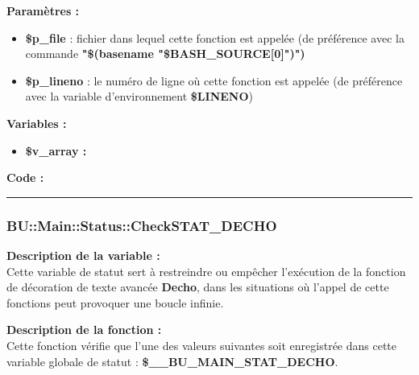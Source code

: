 \documentclass[a4paper,10pt]{article}
\begin{document}
\begin{justify}
    \textbf{Paramètres :}

    \begin{itemize}
        \item \color{orange}\textbf{\$p\_file}\color{white} : fichier dans lequel cette fonction est appelée (de préférence avec la commande \textbf{\textbf{"\$(\color{gray}basename \color{white}"\color{orange}\$BASH\_SOURCE[0]\color{white}")")}}\\

        \item \color{orange}\textbf{\$p\_lineno}\color{white} : le numéro de ligne où cette fonction est appelée (de préférence avec la variable d'environnement \textbf{\color{orange}\$LINENO})
    \end{itemize}
\end{justify}

\begin{justify}
    \textbf{Variables :}

    \begin{itemize}
        \item \textbf{\color{orange}\$v\_array\color{white} :} \\
    \end{itemize}
\end{justify}

\textbf{Code :}



\color{blue}\par\noindent\rule{\textwidth}{0.4pt}\color{white}

\color{blue}
\subsubsection{\color{mauve}BU::Main::Status::CheckSTAT\_DECHO}\color{white}

\begin{justify}
    \textbf{Description de la variable :}\\
    Cette variable de statut sert à restreindre ou empêcher l'exécution de la fonction de décoration de texte avancée \textbf{\color{mauve}Decho}, dans les situations où l'appel de cette fonctions peut provoquer une boucle infinie.
\end{justify}

\begin{justify}
    \textbf{Description de la fonction :}\\
    Cette fonction vérifie que l'une des valeurs suivantes soit enregistrée dans cette variable globale de statut : \textbf{\color{orange}\$\_\_BU\_MAIN\_STAT\_DECHO}.
\end{justify}
\end{document}
